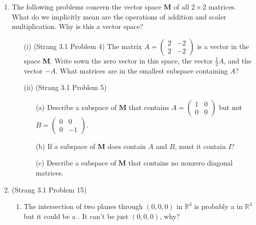\documentclass[11pt]{article}
\newcommand{\rr}{\mathbb{R}}
\begin{document}
\begin{enumerate}

\item The following problems concern the vector space $\mathbf{M}$ of all $2 \times 2$ matrices.  What do we implicitly mean are the operations of addition and scaler multiplication.  Why is this a vector space?

\begin{enumerate}

\item[(i)] (Strang 3.1 Problem 4) The matrix $A = \begin{pmatrix} 2 & -2 \\ 2 & -2 \end{pmatrix}$ is a vector in the space $\mathbf{M}$.  Write sown the zero vector in this space, the vector $\frac{1}{2} A$, and the vector $-A$.  What matrices are in the smallest subspace containing $A$?

\item[(ii)] (Strang 3.1 Problem 5) 

\begin{enumerate}

\item[(a)] Describe a subspace of $\mathbf{M}$ that contains $A = \begin{pmatrix} 1 & 0 \\ 0 & 0 \end{pmatrix}$ but not $B = \begin{pmatrix} 0 & 0 \\ 0 & -1 \end{pmatrix}$.

\item[(b)] If a subspace of $\mathbf{M}$ does contain $A$ and $B$, must it contain $I$?

\item[(c)] Describe a subspace of $\mathbf{M}$ that contains no nonzero diagonal matrices.

\end{enumerate}

\end{enumerate}


\item (Strang 3.1 Problem 15) 

\begin{enumerate}

\item The intersection of two planes through $(0,0,0)$ in $\rr^3$ is probably a \underline{\phantom{aaaaaaaaaaaa}} in $\rr^3$ but it could be a \underline{\phantom{aaaaaaaaaaaa}}.  It can't be just $(0,0,0)$, why?


\end{enumerate}
\end{enumerate}
\end{document}
